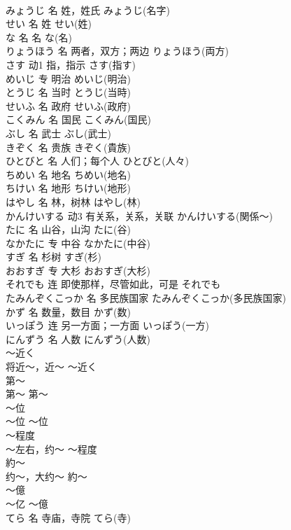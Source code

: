 \documentclass[8pt]{extreport}
\begin{document}
\begin{CJK}{UTF8}{min}
\\	みょうじ	名	姓，姓氏	みょうじ(名字)	
\\	せい	名	姓	せい(姓)	
\\	な	名	名	な(名)	
\\	りょうほう	名	两者，双方；两边	りょうほう(両方)	
\\	さす	动1	指，指示	さす(指す)	
\\	めいじ	专	明治	めいじ(明治)	
\\	とうじ	名	当时	とうじ(当時)	
\\	せいふ	名	政府	せいふ(政府)	
\\	こくみん	名	国民	こくみん(国民)	
\\	ぶし	名	武士	ぶし(武士)	
\\	きぞく	名	贵族	きぞく(貴族)	
\\	ひとびと	名	人们；每个人	ひとびと(人々)	
\\	ちめい	名	地名	ちめい(地名)	
\\	ちけい	名	地形	ちけい(地形)	
\\	はやし	名	林，树林	はやし(林)	
\\	かんけいする	动3	有关系，关系，关联	かんけいする(関係～)	
\\	たに	名	山谷，山沟	たに(谷)	
\\	なかたに	专	中谷	なかたに(中谷)	
\\	すぎ	名	杉树	すぎ(杉)	
\\	おおすぎ	专	大杉	おおすぎ(大杉)	
\\	それでも	连	即使那样，尽管如此，可是	それでも	
\\	たみんぞくこっか	名	多民族国家	たみんぞくこっか(多民族国家)	
\\	かず	名	数量，数目	かず(数)	
\\	いっぽう	连	另一方面；一方面	いっぽう(一方)	
\\	にんずう	名	人数	にんずう(人数)	
\\	～近く	
\\	将近～，近～	～近く	
\\	第～	
\\	第～	第～	
\\	～位	
\\	～位	～位	
\\	～程度	
\\	～左右，约～	～程度	
\\	約～	
\\	约～，大约～	約～	
\\	～億	
\\	～亿	～億	
\\	てら	名	寺庙，寺院	てら(寺)	

\end{CJK}
\end{document}
